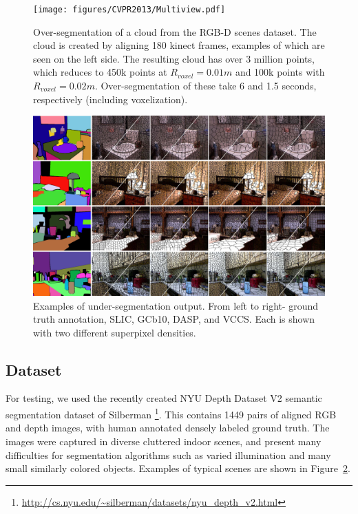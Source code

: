 \begin{figure}
\begin{center}
\texttt{[image: figures/CVPR2013/Multiview.pdf]}
\end{center}
   \caption[Supervoxels from Multiple Views]{Over-segmentation of a cloud from the RGB-D scenes dataset\cite{RGBDDataset}. The cloud is created by aligning 180 kinect frames, examples of which are seen on the left side. The resulting cloud has over 3 million points, which reduces to 450k points at ${R}_{voxel}=0.01m$ and 100k points with ${R}_{voxel}=0.02m$. Over-segmentation of these take 6 and 1.5 seconds, respectively (including voxelization).}
\label{fig:MultiViewCloud}
\end{figure}

\begin{figure}
\begin{center}
\includegraphics[width=1.01\linewidth]{figures/CVPR2013/Comparison_Segmentation_Small.pdf}
\end{center}
   \caption[Superpixel Comparison]{Examples of under-segmentation output. From left to right- ground truth annotation, SLIC, GCb10, DASP, and VCCS. Each is shown with two different superpixel densities.}
\label{fig:ExampleSegmentations}
\end{figure}

\subsection{Dataset}
For testing, we used the recently created NYU Depth Dataset V2 semantic segmentation dataset of Silberman  \cite{NYUDataset}\footnote{\url{http://cs.nyu.edu/~silberman/datasets/nyu_depth_v2.html}}. This contains 1449 pairs of aligned RGB and depth images, with human annotated densely labeled ground truth. The images were captured in diverse cluttered indoor scenes, and present many difficulties for segmentation algorithms such as varied illumination and many small similarly colored objects. Examples of typical scenes are shown in Figure~\ref{fig:ExampleSegmentations}.


